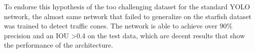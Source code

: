 \documentclass[landscape,a2,final,12pt]{issposter}
\begin{document}
\begin{multicols}{3}
\begin{samepage}
\begin{small}
\begin{figure}
\begin{minipage}[b]{.4\textwidth}
\begin{center}
                        \captionsetup{justification=centering}
                        \label{fig:cones}
                        \end{center}
                    \end{minipage}
                \end{figure}

            To endorse this hypothesis of the too challenging dataset for the standard YOLO network, the almost same network that 
            failed to generalize on the starfish dataset was trained to detect traffic cones. The network is able to achieve 
            over 90\% precision and an IOU \textgreater 0.4 on the test data, which are
            decent results that show the performance of the architecture. 
        \end{small}
    \end{samepage}
\end{multicols}
\end{document}
